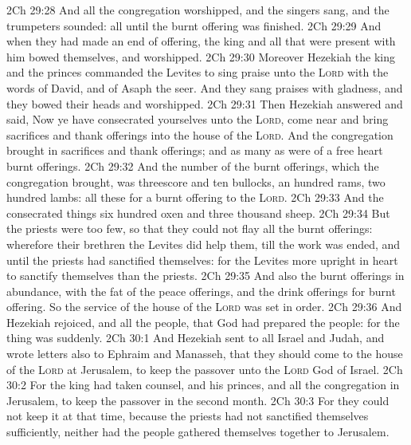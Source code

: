 \vs 2Ch 29:28 And all the congregation worshipped, and the singers sang, and the trumpeters sounded:  all  until the burnt offering was finished.
\vs 2Ch 29:29 And when they had made an end of offering, the king and all that were present with him bowed themselves, and worshipped.
\vs 2Ch 29:30 Moreover Hezekiah the king and the princes commanded the Levites to sing praise unto the \textsc{Lord} with the words of David, and of Asaph the seer. And they sang praises with gladness, and they bowed their heads and worshipped.
\vs 2Ch 29:31 Then Hezekiah answered and said, Now ye have consecrated yourselves unto the \textsc{Lord}, come near and bring sacrifices and thank offerings into the house of the \textsc{Lord}. And the congregation brought in sacrifices and thank offerings; and as many as were of a free heart burnt offerings.
\vs 2Ch 29:32 And the number of the burnt offerings, which the congregation brought, was threescore and ten bullocks, an hundred rams,  two hundred lambs: all these  for a burnt offering to the \textsc{Lord}.
\vs 2Ch 29:33 And the consecrated things  six hundred oxen and three thousand sheep.
\vs 2Ch 29:34 But the priests were too few, so that they could not flay all the burnt offerings: wherefore their brethren the Levites did help them, till the work was ended, and until the  priests had sanctified themselves: for the Levites  more upright in heart to sanctify themselves than the priests.
\vs 2Ch 29:35 And also the burnt offerings  in abundance, with the fat of the peace offerings, and the drink offerings for  burnt offering. So the service of the house of the \textsc{Lord} was set in order.
\vs 2Ch 29:36 And Hezekiah rejoiced, and all the people, that God had prepared the people: for the thing was  suddenly.
\vs 2Ch 30:1 And Hezekiah sent to all Israel and Judah, and wrote letters also to Ephraim and Manasseh, that they should come to the house of the \textsc{Lord} at Jerusalem, to keep the passover unto the \textsc{Lord} God of Israel.
\vs 2Ch 30:2 For the king had taken counsel, and his princes, and all the congregation in Jerusalem, to keep the passover in the second month.
\vs 2Ch 30:3 For they could not keep it at that time, because the priests had not sanctified themselves sufficiently, neither had the people gathered themselves together to Jerusalem.
